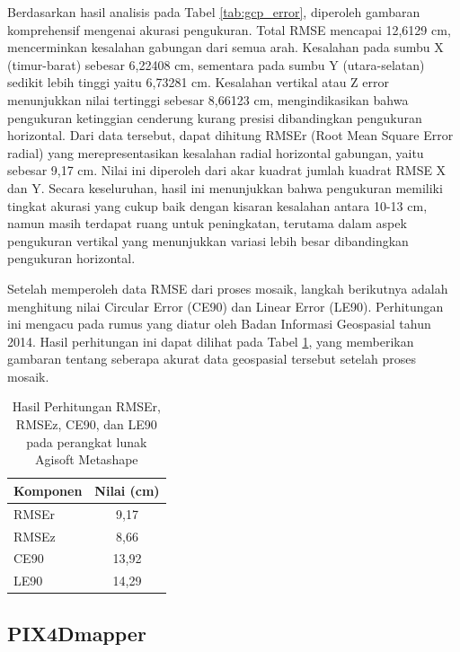 Berdasarkan hasil analisis pada Tabel \ref{tab:gcp_error}, diperoleh gambaran komprehensif mengenai akurasi pengukuran. Total RMSE mencapai 12,6129 cm, mencerminkan kesalahan gabungan dari semua arah. Kesalahan pada sumbu X (timur-barat) sebesar 6,22408 cm, sementara pada sumbu Y (utara-selatan) sedikit lebih tinggi yaitu 6,73281 cm. Kesalahan vertikal atau Z error menunjukkan nilai tertinggi sebesar 8,66123 cm, mengindikasikan bahwa pengukuran ketinggian cenderung kurang presisi dibandingkan pengukuran horizontal. Dari data tersebut, dapat dihitung RMSEr (Root Mean Square Error radial) yang merepresentasikan kesalahan radial horizontal gabungan, yaitu sebesar 9,17 cm. Nilai ini diperoleh dari akar kuadrat jumlah kuadrat RMSE X dan Y. Secara keseluruhan, hasil ini menunjukkan bahwa pengukuran memiliki tingkat akurasi yang cukup baik dengan kisaran kesalahan antara 10-13 cm, namun masih terdapat ruang untuk peningkatan, terutama dalam aspek pengukuran vertikal yang menunjukkan variasi lebih besar dibandingkan pengukuran horizontal.

Setelah memperoleh data RMSE dari proses mosaik, langkah berikutnya adalah menghitung nilai Circular Error (CE90) dan Linear Error (LE90). Perhitungan ini mengacu pada rumus yang diatur oleh Badan Informasi Geospasial tahun 2014. Hasil perhitungan ini dapat dilihat pada Tabel \ref{tab:hasil_perhitungan ce}, yang memberikan gambaran tentang seberapa akurat data geospasial tersebut setelah proses mosaik.

\begin{table}[H]
\centering
\caption{Hasil Perhitungan RMSEr, RMSEz, CE90, dan LE90 pada perangkat lunak Agisoft Metashape}
\begin{tabular}{|l|c|}
\hline
\textbf{Komponen} & \textbf{Nilai (cm)} \\
\hline
RMSEr & 9,17 \\
RMSEz & 8,66 \\
CE90 & 13,92 \\
LE90 & 14,29 \\
\hline
\end{tabular}
\label{tab:hasil_perhitungan ce}
\end{table}

\subsection{PIX4Dmapper}

